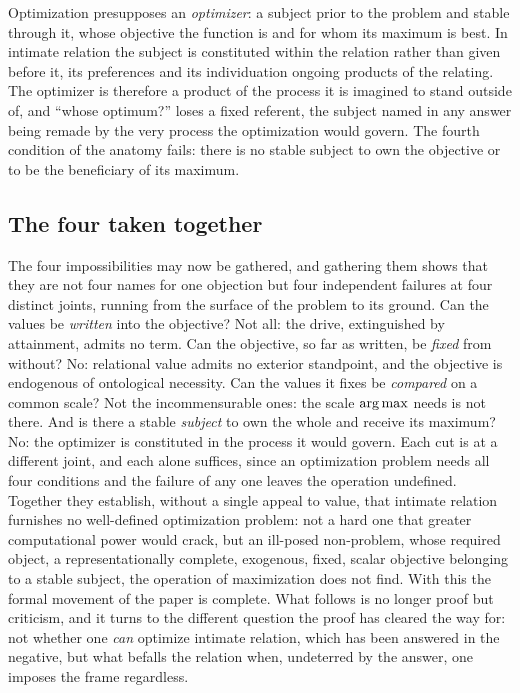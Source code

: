 \begin{claim}
Optimization presupposes an \emph{optimizer}: a subject prior to the problem and stable through it, whose objective the function is and for whom its maximum is best. In intimate relation the subject is constituted within the relation rather than given before it, its preferences and its individuation ongoing products of the relating. The optimizer is therefore a product of the process it is imagined to stand outside of, and ``whose optimum?'' loses a fixed referent, the subject named in any answer being remade by the very process the optimization would govern. The fourth condition of the anatomy fails: there is no stable subject to own the objective or to be the beneficiary of its maximum.
\end{claim}

\subsection*{The four taken together}

The four impossibilities may now be gathered, and gathering them shows that they are not four names for one objection but four independent failures at four distinct joints, running from the surface of the problem to its ground. Can the values be \emph{written} into the objective? Not all: the drive, extinguished by attainment, admits no term. Can the objective, so far as written, be \emph{fixed} from without? No: relational value admits no exterior standpoint, and the objective is endogenous of ontological necessity. Can the values it fixes be \emph{compared} on a common scale? Not the incommensurable ones: the scale $\operatorname*{arg\,max}$ needs is not there. And is there a stable \emph{subject} to own the whole and receive its maximum? No: the optimizer is constituted in the process it would govern. Each cut is at a different joint, and each alone suffices, since an optimization problem needs all four conditions and the failure of any one leaves the operation undefined. Together they establish, without a single appeal to value, that intimate relation furnishes no well-defined optimization problem: not a hard one that greater computational power would crack, but an ill-posed non-problem, whose required object, a representationally complete, exogenous, fixed, scalar objective belonging to a stable subject, the operation of maximization does not find. With this the formal movement of the paper is complete. What follows is no longer proof but criticism, and it turns to the different question the proof has cleared the way for: not whether one \emph{can} optimize intimate relation, which has been answered in the negative, but what befalls the relation when, undeterred by the answer, one imposes the frame regardless.

